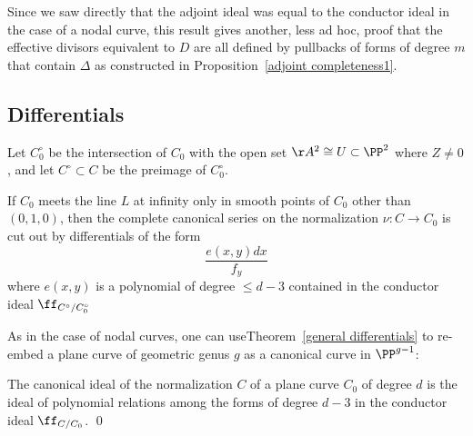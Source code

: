 Since we saw directly that the adjoint ideal was equal to the conductor ideal in the case of
a nodal curve, this result gives another, less ad hoc, proof that the effective divisors equivalent to $D$
are all defined by
pullbacks of forms of degree $m$ that contain $\Delta$
as constructed in Proposition~\ref{adjoint completeness1}.

\subsection{Differentials}

Let $C^\circ_0$ be the intersection of $C_0$ with the open set $\AA^{2}\cong U\subset \PP^{2}$ where $Z \neq 0$, 
and let $C^\circ \subset C$ be the preimage of $C^\circ_0$.

\begin{theorem}\label{general differentials}
If $C_{0}$ meets the line $L$ at infinity only in smooth points of $C_{0}$ other than $(0,1,0)$, then the complete canonical series on the normalization $\nu: C \to C_{0}$ is cut out by differentials of the form
$$
 \frac{e(x,y)dx}{f_{y}}
$$
where $e(x,y)$ is a polynomial of degree $\leq d-3$ contained in the 
conductor ideal $\ff_{C^{\circ}/C_{0}^{\circ}}$
\end{theorem}

As in the case of nodal curves, one can useTheorem~\ref{general differentials} to re-embed a plane curve of 
geometric genus $g$ as a canonical
curve in $\PP^{g-1}$:

\begin{corollary}
 The canonical ideal of the normalization $C$ of a plane curve $C_{0}$ of degree $d$ 
 is the ideal of polynomial relations
 among the forms of degree $d-3$ in the conductor ideal $\ff_{C/C_{0}}$. \qed
\end{corollary}

